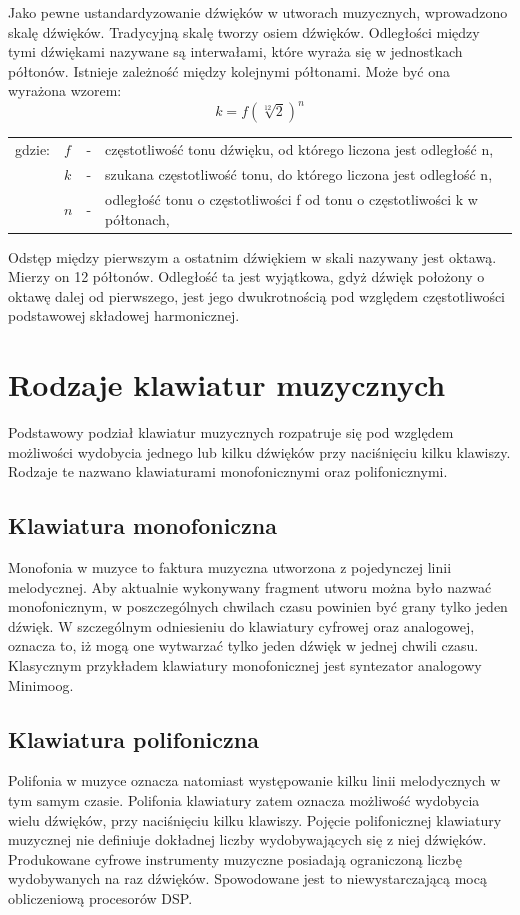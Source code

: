 Jako pewne ustandardyzowanie dźwięków w utworach muzycznych, wprowadzono skalę dźwięków. Tradycyjną skalę tworzy osiem dźwięków. Odległości między tymi dźwiękami nazywane są interwałami, które wyraża się w jednostkach półtonów. Istnieje zależność między kolejnymi półtonami. Może być ona wyrażona wzorem:
\begin{equation} \label{equ:idft}
k = f(\sqrt[12]{2})^{n}
\end{equation}
\begin{tabular}{ l l l l}
	gdzie: 	&	$f$ & - &  częstotliwość tonu dźwięku, od którego liczona jest odległość n, \\
	&	$k$ & - &  szukana częstotliwość tonu, do którego liczona jest odległość n, \\
	&   $n$ &  - & odległość tonu o częstotliwości f od tonu o częstotliwości k w półtonach, \\
\end{tabular}

Odstęp między pierwszym a ostatnim dźwiękiem w skali nazywany jest oktawą. Mierzy on 12 półtonów. Odległość ta jest wyjątkowa, gdyż dźwięk położony o oktawę dalej od pierwszego, jest jego dwukrotnością pod względem częstotliwości podstawowej składowej harmonicznej.



\section{Rodzaje klawiatur muzycznych}
Podstawowy podział klawiatur muzycznych rozpatruje się pod względem możliwości wydobycia jednego lub kilku dźwięków przy naciśnięciu kilku klawiszy. Rodzaje te nazwano klawiaturami monofonicznymi oraz polifonicznymi.

\subsection{Klawiatura monofoniczna}
Monofonia w muzyce to faktura muzyczna utworzona z pojedynczej linii melodycznej. Aby aktualnie wykonywany fragment utworu można było nazwać monofonicznym, w poszczególnych chwilach czasu powinien być grany tylko jeden dźwięk. W szczególnym odniesieniu do klawiatury cyfrowej oraz analogowej, oznacza to, iż mogą one wytwarzać tylko jeden dźwięk w jednej chwili czasu. Klasycznym przykładem klawiatury monofonicznej jest syntezator analogowy Minimoog.

\subsection{Klawiatura polifoniczna}
Polifonia w muzyce oznacza natomiast występowanie kilku linii melodycznych w tym samym czasie. Polifonia klawiatury zatem oznacza możliwość wydobycia wielu dźwięków, przy naciśnięciu kilku klawiszy. Pojęcie polifonicznej klawiatury muzycznej nie definiuje dokładnej liczby wydobywających się z niej dźwięków. Produkowane cyfrowe instrumenty muzyczne posiadają ograniczoną liczbę wydobywanych na raz dźwięków. Spowodowane jest to niewystarczającą mocą obliczeniową procesorów DSP.

